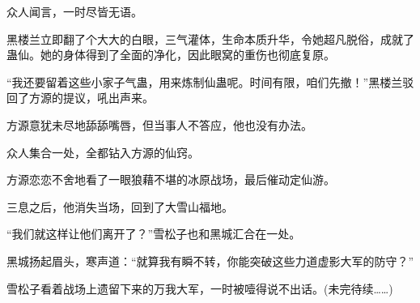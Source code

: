 \begin{this_body}
众人闻言，一时尽皆无语。

黑楼兰立即翻了个大大的白眼，三气灌体，生命本质升华，令她超凡脱俗，成就了蛊仙。她的身体得到了全面的净化，因此眼窝的重伤也彻底复原。

“我还要留着这些小家子气蛊，用来炼制仙蛊呢。时间有限，咱们先撤！”黑楼兰驳回了方源的提议，吼出声来。

方源意犹未尽地舔舔嘴唇，但当事人不答应，他也没有办法。

众人集合一处，全都钻入方源的仙窍。

方源恋恋不舍地看了一眼狼藉不堪的冰原战场，最后催动定仙游。

三息之后，他消失当场，回到了大雪山福地。

“我们就这样让他们离开了？”雪松子也和黑城汇合在一处。

黑城扬起眉头，寒声道：“就算我有瞬不转，你能突破这些力道虚影大军的防守？”

雪松子看着战场上遗留下来的万我大军，一时被噎得说不出话。(未完待续……)

\end{this_body}

